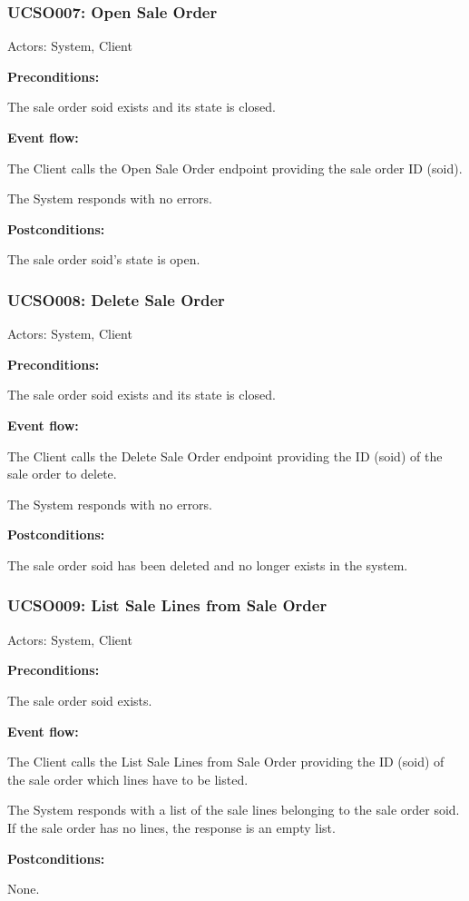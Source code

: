 \begin{ucbox}{\subsubsection{UCSO007: Open Sale Order}}
\label{UCSO007}

Actors: System, Client

\textbf{Preconditions:}

\ucitem The sale order soid exists and its state is closed.

\textbf{Event flow:}

\ucitem The Client calls the Open Sale Order endpoint providing the sale order ID (soid).

\ucitem The System responds with no errors.

\textbf{Postconditions:}

\ucitem The sale order soid’s state is open.

\end{ucbox}

\begin{ucbox}{\subsubsection{UCSO008: Delete Sale Order}}
\label{UCSO008}

Actors: System, Client

\textbf{Preconditions:}

\ucitem The sale order soid exists and its state is closed.

\textbf{Event flow:}

\ucitem The Client calls the Delete Sale Order endpoint providing the ID (soid) of the sale order to delete.

\ucitem The System responds with no errors.

\textbf{Postconditions:}

\ucitem The sale order soid has been deleted and no longer exists in the system.

\end{ucbox}

\begin{ucbox}{\subsubsection{UCSO009: List Sale Lines from Sale Order}}
\label{UCSO009}

Actors: System, Client

\textbf{Preconditions:}

\ucitem The sale order soid exists.

\textbf{Event flow:}

\ucitem The Client calls the List Sale Lines from Sale Order providing the ID (soid) of the sale order which lines have to be listed.

\ucitem The System responds with a list of the sale lines belonging to the sale order soid. If the sale order has no lines, the response is an empty list.

\textbf{Postconditions:}

\ucitem None.

\end{ucbox}

